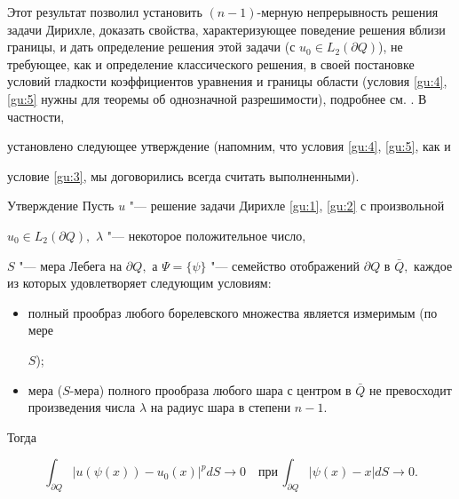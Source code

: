 Этот результат позволил установить $(n-1)$-мерную непрерывность решения задачи Дирихле, доказать свойства, характеризующее поведение решения вблизи границы, и дать определение решения этой задачи (с $u_0 \in L_2(\partial Q)$), не требующее, как и определение классического решения, в своей постановке условий гладкости коэффициентов уравнения и границы области (условия \eqref{gu:4}, \eqref{gu:5} нужны для теоремы об однозначной разрешимости), подробнее см. \cite{G88}. В частности,

установлено следующее утверждение (напомним, что условия \eqref{gu:4}, \eqref{gu:5}, как и

условие \eqref{gu:3}, мы договорились всегда считать выполненными).



\smallskip

\begin{newthm}{Утверждение} Пусть $u$ "--- решение задачи Дирихле \eqref{gu:1}{\rm ,} \eqref{gu:2} с произвольной

$u_0 \in L_2(\partial Q),$ $\lambda$ "--- некоторое положительное число{\rm ,}

$S $ "--- мера Лебега на $\partial Q,$ а $\Psi = \{ \psi\}$ "--- семейство отображений $\partial Q$ в $\bar {Q}, $ каждое из которых удовлетворяет следующим условиям\/{\rm :} 



\begin{itemize}

\item[$a)$] полный прообраз любого борелевского множества является измеримым {\rm (}по мере

$S${\rm );}



\item[$b)$] мера {\rm (}$S$-мера{\rm )} полного прообраза любого шара с центром в $\bar {Q} $ не превосходит произведения числа $\lambda$ на радиус шара в степени $n- 1.$



\end{itemize}

Тогда 

$$

\int_{\partial Q} |u(\psi(x)) - u_0(x)|^p dS \to 0 \quad \mbox{при} \,

\int_{\partial Q} |\psi(x) - x| dS \to 0 .

$$

\end{newthm}



